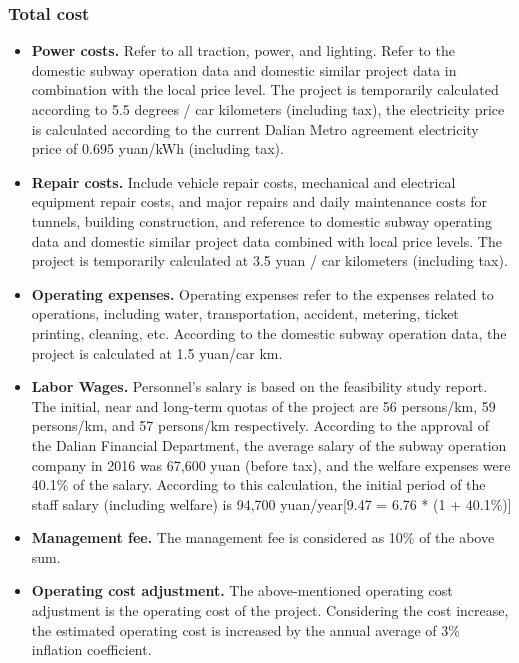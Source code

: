 \documentclass[12pt]{article}
\begin{document}
\subsubsection{Total cost}
\begin{itemize}
    \item {\bfseries Power costs.} Refer to all traction, power, and lighting. Refer to the domestic subway operation data and domestic similar project data in combination with the local price level. The project is temporarily calculated according to 5.5 degrees / car kilometers (including tax), the electricity price is calculated according to the current Dalian Metro agreement electricity price of 0.695 yuan/kWh (including tax).
    \item {\bfseries Repair costs.} Include vehicle repair costs, mechanical and electrical equipment repair costs, and major repairs and daily maintenance costs for tunnels, building construction, and reference to domestic subway operating data and domestic similar project data combined with local price levels. The project is temporarily calculated at 3.5 yuan / car kilometers (including tax).
    \item {\bfseries Operating expenses.} Operating expenses refer to the expenses related to operations, including water, transportation, accident, metering, ticket printing, cleaning, etc. According to the domestic subway operation data, the project is calculated at 1.5 yuan/car km.
    \item  {\bfseries Labor Wages.} Personnel's salary is based on the feasibility study report. The initial, near and long-term quotas of the project are 56 persons/km, 59 persons/km, and 57 persons/km respectively. According to the approval of the Dalian Financial Department, the average salary of the subway operation company in 2016 was 67,600 yuan (before tax), and the welfare expenses were 40.1\% of the salary. According to this calculation, the initial period of the staff salary (including welfare) is 94,700 yuan/year[9.47 = 6.76 * (1 + 40.1\%)]
    \item  {\bfseries Management fee.} The management fee is considered as 10\% of the above sum.
    \item  {\bfseries Operating cost adjustment.} The above-mentioned operating cost adjustment is the operating cost of the project. Considering the cost increase, the estimated operating cost is increased by the annual average of 3\% inflation coefficient.

\end{itemize}
\end{document}

